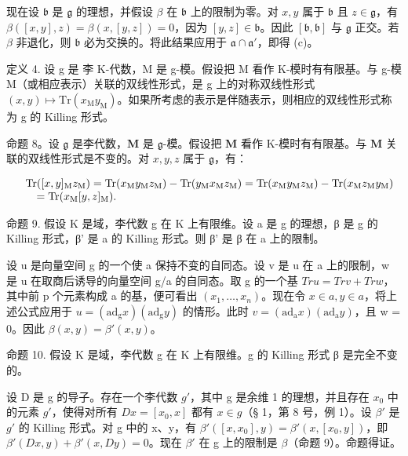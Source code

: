 现在设 \(\mathfrak{b}\) 是 \(\mathfrak{g}\) 的理想，并假设 \(\beta\) 在 \(\mathfrak{b}\) 上的限制为零。对 \(x, y\) 属于 \(\mathfrak{b}\) 且 \(z \in \mathfrak{g}\)，有 \(\beta ([ x, y ], z) = \beta(x, [y, z]) = 0\)，因为 \([y, z] \in \mathfrak{b}\)。因此 \([\mathfrak{b}, \mathfrak{b}]\) 与 \(\mathfrak{g}\) 正交。若 \(\beta\) 非退化，则 \(\mathfrak{b}\) 必为交换的。将此结果应用于 \(\mathfrak{a} \cap \mathfrak{a}'\)，即得 (c)。

定义 4. 设 g 是 李 K-代数，M 是 g-模。假设把 M 看作 K-模时有有限基。与 g-模 M（或相应表示）关联的双线性形式，是 g 上的对称双线性形式 \((x,y)\mapsto\mathrm{Tr}(x_{\mathrm{M}} y_{\mathrm{M}})\)。如果所考虑的表示是伴随表示，则相应的双线性形式称为 g 的 Killing 形式。

命题 8。设 \(\mathfrak{g}\) 是李代数，\(\mathbf{M}\) 是 \(\mathfrak{g}\)-模。假设把 \(\mathbf{M}\) 看作 K-模时有有限基。与 \(\mathbf{M}\) 关联的双线性形式是不变的。对 \(x, y, z\) 属于 \(\mathfrak{g}\)，有：

\[
\begin{array}{r l} & {\mathrm{Tr} ([ x, y ] _ {\mathrm{M}} z _ {\mathrm{M}}) = \mathrm{Tr} (x _ {\mathrm{M}} y _ {\mathrm{M}} z _ {\mathrm{M}}) - \mathrm{Tr} (y _ {\mathrm{M}} x _ {\mathrm{M}} z _ {\mathrm{M}}) = \mathrm{Tr} (x _ {\mathrm{M}} y _ {\mathrm{M}} z _ {\mathrm{M}}) - \mathrm{Tr} (x _ {\mathrm{M}} z _ {\mathrm{M}} y _ {\mathrm{M}})} \\ & {\quad = \mathrm{Tr} (x _ {\mathrm{M}} [ y, z ] _ {\mathrm{M}}).} \end{array}
\]

命题 9. 假设 K 是域，李代数 g 在 K 上有限维。设 a 是 g 的理想，β 是 g 的 Killing 形式，β' 是 a 的 Killing 形式。则 β' 是 β 在 a 上的限制。

设 u 是向量空间 g 的一个使 a 保持不变的自同态。设 v 是 u 在 a 上的限制，w 是 u 在取商后诱导的向量空间 g/a 的自同态。取 g 的一个基 \(Tr u = Tr v + Tr w\)，其中前 p 个元素构成 a 的基，便可看出 \((x_{1}, \ldots, x_{n})\)。现在令 \(x \in a, y \in a\)，将上述公式应用于 \(u = (\mathrm{ad}_{\mathrm{g}} x)(\mathrm{ad}_{\mathrm{g}} y)\) 的情形。此时 \(v = (\mathrm{ad}_{\mathrm{a}} x)(\mathrm{ad}_{\mathrm{a}} y)\)，且 w = 0。因此 \(\beta(x, y) = \beta'(x, y)\)。

命题 10. 假设 K 是域，李代数 g 在 K 上有限维。g 的 Killing 形式 β 是完全不变的。

设 D 是 g 的导子。存在一个李代数 \(g'\)，其中 g 是余维 1 的理想，并且存在 \(x_{0}\) 中的元素 \(g'\)，使得对所有 \(Dx = [x_{0}, x]\) 都有 \(x \in g\)（§ 1，第 8 号，例 1）。设 \(\beta'\) 是 \(g'\) 的 Killing 形式。对 g 中的 x、y，有 \(\beta'([x, x_{0}], y) = \beta'(x, [x_{0}, y])\)，即 \(\beta'(Dx, y) + \beta'(x, Dy) = 0\)。现在 \(\beta'\) 在 g 上的限制是 \(\beta\)（命题 9）。命题得证。

